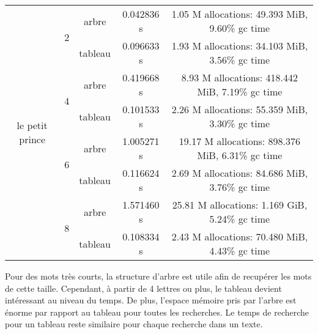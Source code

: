 \documentclass[a4paper,12pt]{article}
\begin{document}
\begin{center}
\begin{tabular}{|c|c|c|c|c|}
    \multirow{8}{*}{le petit prince} & \multirow{2}{*}{2} & arbre & 0.042836 s  & 1.05 M allocations: 49.393 MiB, 9.60\% gc time\\
    \cline{3-5}
    & & tableau & 0.096633 s & 1.93 M allocations: 34.103 MiB, 3.56\% gc time\\
    \cline{2-5}
    & \multirow{2}{*}{4} & arbre & 0.419668 s & 8.93 M allocations: 418.442 MiB, 7.19\% gc time\\
    \cline{3-5}
    & & tableau & 0.101533 s & 2.26 M allocations: 55.359 MiB, 3.30\% gc time\\
    \cline{2-5}
    & \multirow{2}{*}{6} & arbre & 1.005271 s & 19.17 M allocations: 898.376 MiB, 6.31\% gc time\\
    \cline{3-5}
    & & tableau & 0.116624 s & 2.69 M allocations: 84.686 MiB, 3.76\% gc time\\
    \cline{2-5}
    & \multirow{2}{*}{8} & arbre & 1.571460 s & 25.81 M allocations: 1.169 GiB, 5.24\% gc time\\
    \cline{3-5}
    & & tableau & 0.108334 s & 2.43 M allocations: 70.480 MiB, 4.43\% gc time\\
    \hline
  \end{tabular}
\end{center}

Pour des mots très courts, la structure d'arbre est utile afin de recupérer les mots de cette taille. Cependant, à partir de 4 lettres ou plus, le tableau devient intéressant au niveau du temps. De plus, l'espace mémoire pris par l'arbre est énorme par rapport au tableau pour toutes les recherches. Le temps de recherche pour un tableau reste similaire pour chaque recherche dans un texte.
\end{document}

